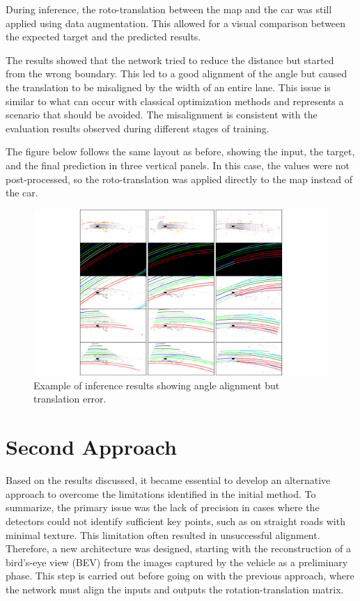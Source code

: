 During inference, the roto-translation between the map and the car was still applied using data augmentation. This allowed for a visual comparison between the expected target and the predicted results.

The results showed that the network tried to reduce the distance but started from the wrong boundary. This led to a good alignment of the angle but caused the translation to be misaligned by the width of an entire lane. This issue is similar to what can occur with classical optimization methods and represents a scenario that should be avoided. The misalignment is consistent with the evaluation results observed during different stages of training.

The figure below follows the same layout as before, showing the input, the target, and the final prediction in three vertical panels. In this case, the values were not post-processed, so the roto-translation was applied directly to the map instead of the car.
\begin{figure}[H]
    \centering
    \includegraphics[width=1\linewidth]{Untitled 2.pdf}
    \caption{Example of inference results showing angle alignment but translation error.}
    \label{fig:inference-results}
\end{figure}

\section{Second Approach}

Based on the results discussed, it became essential to develop an alternative approach to overcome the limitations identified in the initial method. To summarize, the primary issue was the lack of precision in cases where the detectors could not identify sufficient key points, such as on straight roads with minimal texture. This limitation often resulted in unsuccessful alignment. 
Therefore, a new architecture was designed, starting with the reconstruction of a bird’s-eye view (BEV) from the images captured by the vehicle as a preliminary phase. This step is carried out before going on with the previous approach, where the network must align the inputs and outputs the rotation-translation matrix.

